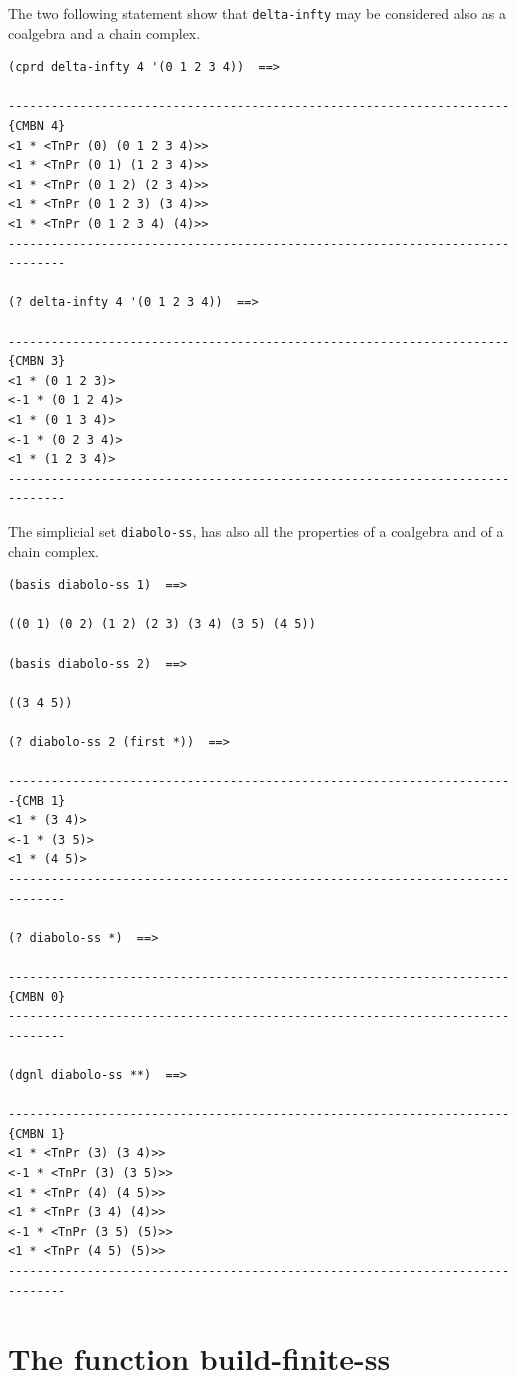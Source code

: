 The two following statement show that {\tt delta-infty} may be considered
also as a coalgebra and a chain complex.
{\footnotesize\begin{verbatim}
(cprd delta-infty 4 '(0 1 2 3 4))  ==>

----------------------------------------------------------------------{CMBN 4}
<1 * <TnPr (0) (0 1 2 3 4)>>
<1 * <TnPr (0 1) (1 2 3 4)>>
<1 * <TnPr (0 1 2) (2 3 4)>>
<1 * <TnPr (0 1 2 3) (3 4)>>
<1 * <TnPr (0 1 2 3 4) (4)>>
------------------------------------------------------------------------------

(? delta-infty 4 '(0 1 2 3 4))  ==>

----------------------------------------------------------------------{CMBN 3}
<1 * (0 1 2 3)>
<-1 * (0 1 2 4)>
<1 * (0 1 3 4)>
<-1 * (0 2 3 4)>
<1 * (1 2 3 4)>
------------------------------------------------------------------------------

\end{verbatim}}
The simplicial set {\tt diabolo-ss},  has also all the properties of a coalgebra and
of a chain complex.
{\footnotesize\begin{verbatim}
(basis diabolo-ss 1)  ==>

((0 1) (0 2) (1 2) (2 3) (3 4) (3 5) (4 5))

(basis diabolo-ss 2)  ==>

((3 4 5))

(? diabolo-ss 2 (first *))  ==>

-----------------------------------------------------------------------{CMB 1}
<1 * (3 4)>
<-1 * (3 5)>
<1 * (4 5)>
------------------------------------------------------------------------------

(? diabolo-ss *)  ==>

----------------------------------------------------------------------{CMBN 0}
------------------------------------------------------------------------------

(dgnl diabolo-ss **)  ==>

----------------------------------------------------------------------{CMBN 1}
<1 * <TnPr (3) (3 4)>>
<-1 * <TnPr (3) (3 5)>>
<1 * <TnPr (4) (4 5)>>
<1 * <TnPr (3 4) (4)>>
<-1 * <TnPr (3 5) (5)>>
<1 * <TnPr (4 5) (5)>>
------------------------------------------------------------------------------

\end{verbatim}}

\newpage

\section{The function build-finite-ss}

